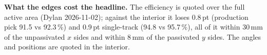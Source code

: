 \textbf{What the edges cost the headline.} The efficiency is quoted over the full active area (Dylan 2026-11-02);
against the interior it loses 0.8\,pt (production pick 91.5 vs 92.3\,\%) and 0.9\,pt single-track (94.8 vs 95.7\,\%),
all of it within 30\,mm of the unpassivated $x$ sides and within 8\,mm of the passivated $y$ sides. The angles and positions
are quoted in the interior.
